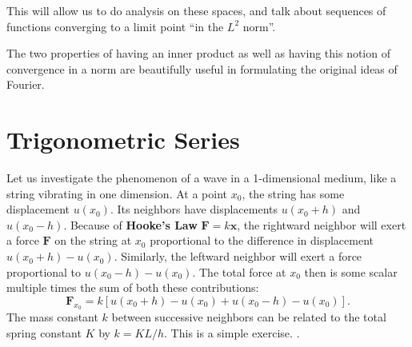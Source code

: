 
	This will allow us to do analysis on these spaces, and talk about sequences of functions converging to a limit point ``in the $L^2$ norm''. 
	
	The two properties of having an inner product as well as having this notion of convergence in a norm are beautifully useful in formulating the original ideas of Fourier. 

\section{Trigonometric Series} %
\label{sec:trigonometric_series}

	Let us investigate the phenomenon of a wave in a 1-dimensional medium, like a string vibrating in one dimension. At a point $x_0$, the string has some displacement $u(x_0)$. Its neighbors have displacements $u(x_0 + h)$ and $u(x_0 - h)$. 
	Because of \textbf{Hooke's Law} $\mathbf F = k \mathbf x$, the rightward neighbor will exert a force $\mathbf F$ on the string at $x_0$ proportional to the difference in displacement $u(x_0 + h) - u(x_0)$. Similarly, the leftward neighbor will exert a force proportional to $u(x_0 - h) - u(x_0)$. The total force at $x_0$ then is some scalar multiple times the sum of both these contributions:
	\begin{equation}
		\mathbf F_{x_0} = k [u(x_0 + h) - u(x_0) + u(x_0 - h) - u(x_0)].
	\end{equation}
	The mass constant $k$ between successive neighbors can be related to the total spring constant $K$ by $k = K L / h$. This is a simple exercise. . 
	
